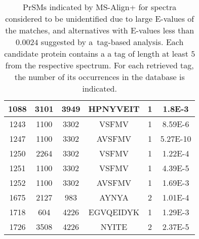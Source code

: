 \documentclass{article}[12pt]
\begin{document}
\begin{landscape}
\begin{table}[h]
{\begin{center}
\begin{tabular}{|c|c||c|c|c|c|}
  \hline
1088& 3101 & 
3949
 & 
HPNYVEIT & 1 & 1.8E-3\\
  \hline
1243& 1100 & 
3302
 & 
VSFMV & 1 & 8.59E-6\\
  \hline
1247& 1100 & 
3302
 & 
AVSFMV & 1 & 5.27E-10\\
  \hline
1250& 2264 & 
3302
 & 
VSFMV & 1 & 1.22E-4\\
  \hline
1251& 1100 & 
3302
 & 
VSFMV & 1 & 4.39E-5\\
  \hline
1252& 1100 & 
3302
 & 
AVSFMV & 1 & 1.69E-3\\
  \hline
1675& 2127 & 
983
 & 
AYNYA & 2 & 1.01E-4\\
  \hline
1718& 604 & 
4226
 & 
EGVQEIDYK & 1 & 1.29E-3\\
  \hline
1726& 3508 & 
4226
 & 
NYITE & 2 & 2.37E-5\\
\hline\end{tabular}
\end{center}
\par}
\centering
\caption{PrSMs indicated by MS-Align+ for spectra considered to be unidentified due to large E-values of the matches, and alternatives with E-values less than $0.0024$ suggested by a~tag-based analysis. Each candidate protein contains a a tag of length at least $5$ from the respective spectrum. For each retrieved tag, the number of its occurrences in the database is indicated.}
\vspace{3mm}
\label{table:unident-spectra}
\end{table}






\end{landscape}
\end{document}

